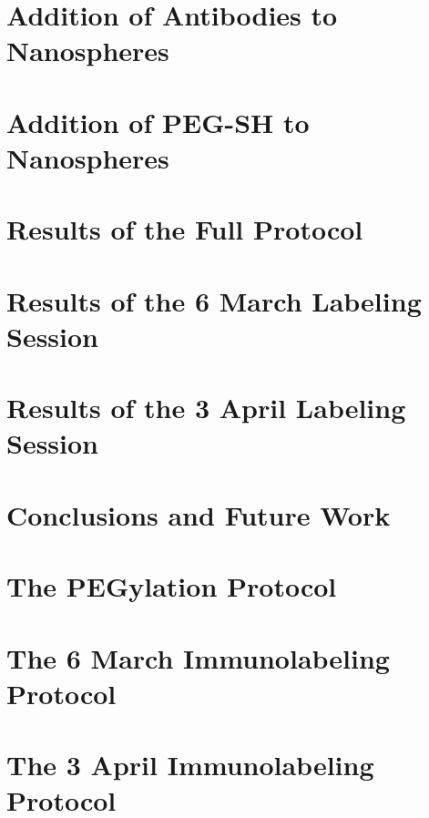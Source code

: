 \documentclass{hmcthesis}
\begin{document}

\newpage
\chapter{Addition of Antibodies to Nanospheres}
\label{additionofantibodiestonanospheres}


\newpage
\chapter{Addition of PEG-SH to Nanospheres}
\label{additionofpeg-shtonanospheres}


\newpage
\chapter{Results of the Full Protocol}
\label{resultsofthefullprotocol}


\newpage
\chapter{Results of the 6 March Labeling Session}
\label{resultsofthe6marchlabelingsession}


\newpage
\chapter{Results of the 3 April Labeling Session}
\label{resultsofthe3aprillabelingsession}


\newpage
\chapter{Conclusions and Future Work}
\label{conclusionsandfuturework}



\appendix
\chapter{The PEGylation Protocol}
\label{ThePEGylationProtocol}


\chapter{The 6 March Immunolabeling Protocol}
\label{The6MarchImmunolabelingProtocol}



\chapter{The 3 April Immunolabeling Protocol}
\label{The3AprilImmunolabelingProtocol}



\newpage

\backmatter




\end{document}
